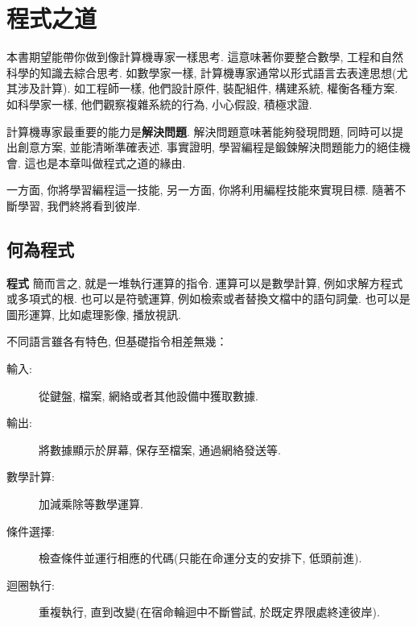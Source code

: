 \documentclass[10pt]{book}
\begin{document}
\begin{latexonly}

\tableofcontents

\clearemptydoublepage

\end{latexonly}

\mainmatter

\chapter{程式之道}

本書期望能帶你做到像計算機專家一樣思考. 
這意味著你要整合數學, 工程和自然科學的知識去綜合思考. 
如數學家一樣, 計算機專家通常以形式語言去表達思想(尤其涉及計算). 
如工程師一樣, 他們設計原件, 裝配組件, 構建系統, 權衡各種方案. 
如科學家一樣, 他們觀察複雜系統的行為, 小心假設, 積極求證. 

計算機專家最重要的能力是{\bf 解決問題}. 
解決問題意味著能夠發現問題, 同時可以提出創意方案, 並能清晰準確表述. 
事實證明, 學習編程是鍛鍊解決問題能力的絕佳機會. 
這也是本章叫做程式之道的緣由. 
 
一方面, 你將學習編程這一技能, 另一方面, 你將利用編程技能來實現目標. 
隨著不斷學習, 我們終將看到彼岸. 

\section{何為程式}

{\bf 程式} 簡而言之, 就是一堆執行運算的指令. 
運算可以是數學計算, 例如求解方程式或多項式的根. 
也可以是符號運算, 例如檢索或者替換文檔中的語句詞彙. 
也可以是圖形運算, 比如處理影像, 播放視訊. 

不同語言雖各有特色, 但基礎指令相差無幾：

\begin{description}

\item[輸入:] 從鍵盤, 檔案, 網絡或者其他設備中獲取數據. 

\item[輸出:] 將數據顯示於屏幕, 保存至檔案, 通過網絡發送等. 

\item[數學計算:] 加減乘除等數學運算. 

\item[條件選擇:] 檢查條件並運行相應的代碼(只能在命運分支的安排下, 低頭前進). 

\item[迴圈執行:] 重複執行, 直到改變(在宿命輪迴中不斷嘗試, 於既定界限處終達彼岸). 

\end{description}
\end{document}
